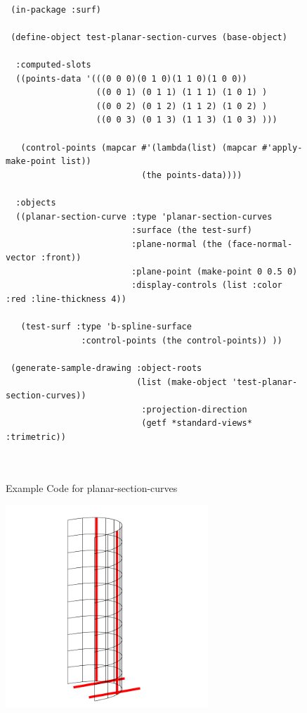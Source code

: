 \documentclass [11pt]{book}
\begin{document}
\begin{itemize}
\begin{figure}
\begin{lrbox}{\boxedverb}
\begin{minipage}{\linewidth}
{\begin{verbatim}

 (in-package :surf)
 
 (define-object test-planar-section-curves (base-object)
  
  :computed-slots
  ((points-data '(((0 0 0)(0 1 0)(1 1 0)(1 0 0))
                  ((0 0 1) (0 1 1) (1 1 1) (1 0 1) )
                  ((0 0 2) (0 1 2) (1 1 2) (1 0 2) )
                  ((0 0 3) (0 1 3) (1 1 3) (1 0 3) )))
   
   (control-points (mapcar #'(lambda(list) (mapcar #'apply-make-point list)) 
                           (the points-data))))
   
  :objects
  ((planar-section-curve :type 'planar-section-curves
                         :surface (the test-surf)
                         :plane-normal (the (face-normal-vector :front))
                         :plane-point (make-point 0 0.5 0)
                         :display-controls (list :color :red :line-thickness 4))
   
   (test-surf :type 'b-spline-surface 
               :control-points (the control-points)) ))

 (generate-sample-drawing :object-roots 
                          (list (make-object 'test-planar-section-curves))
                           :projection-direction 
                           (getf *standard-views* :trimetric))

 
\end{verbatim}}
\end{minipage}
\end{lrbox}
\fbox{\usebox{\boxedverb}}

\caption{Example Code for planar-section-curves}

\label{fig:example-code-planar-section-curves}

\end{figure}

\begin{figure}
\begin{center}
\includegraphics[width=3in,height=3in]{../images/example-planar-section-curves.pdf}
\end{center}


\end{figure}
\end{itemize}
\end{document}
